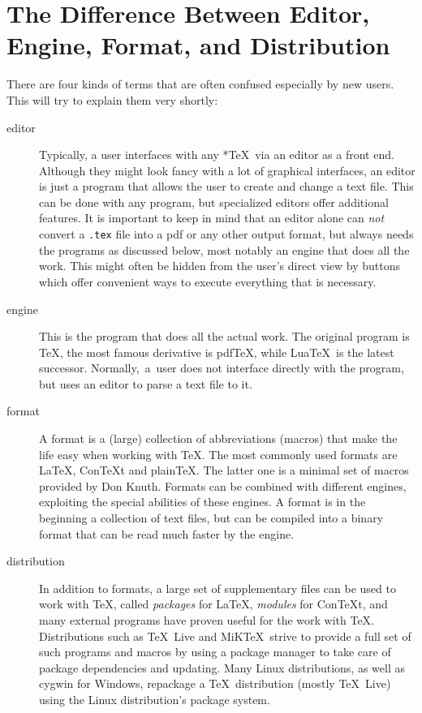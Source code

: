 \setlength{\columnsep}{1.5cm}
\newpage
\tableofcontents


\section{The Difference Between Editor, Engine, Format, and Distribution}
There are four kinds of terms that are often confused especially by new users. This will try to explain them very shortly:
\begin{description}
\item[editor] Typically, a user interfaces with any *\TeX\ via an editor as a front end. Although they might look fancy with a lot of graphical interfaces, an editor is just a program that allows the user to create and change a text file. This can be done with any program, but specialized editors offer additional features. It is important to keep in mind that an editor alone can \emph{not} convert a \verb|.tex| file into a pdf or any other output format, but always needs the programs as discussed below, most notably an engine that does all the work. This might often be hidden from the user's direct view by buttons which offer convenient ways to execute everything that is necessary.
\item[engine] This is the program that does all the actual work. The original program is \TeX, the most famous derivative is pdf\TeX, while Lua\TeX\ is the latest successor. Normally,~a~user does not interface directly with the program, but uses an editor to parse a text file to it.
\item[format] A format is a (large) collection of abbreviations (macros) that make the life easy when working with \TeX. The most commonly used formats are \LaTeX, Con\TeX t and plain\TeX. The latter one is a minimal set of macros provided by Don Knuth. Formats can be combined with different engines, exploiting the special abilities of these engines. A format is in the beginning a collection of text files, but can be compiled into a binary format that can be read much faster by the engine.
\item[distribution] In addition to formats, a large set of supplementary files can be used to work with \TeX, called \emph{packages} for \LaTeX, \emph{modules} for Con\TeX t, and many external programs have proven useful for the work with \TeX. Distributions such as \TeX~Live and MiK\TeX\ strive to provide a full set of such programs and macros by using a package manager to take care of package dependencies and updating. Many Linux distributions, as well as cygwin for Windows, repackage a \TeX\ distribution (mostly \TeX~Live) using the Linux distribution's package system.
\end{description}

